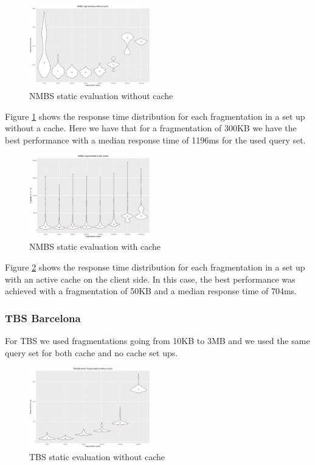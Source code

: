 \documentclass[sw]{iosart2x}
\begin{document}
	\begin{figure}[h]
		\includegraphics[width=0.47\textwidth]{nmbs/static_no_cache.png}
		\caption{NMBS static evaluation without cache}\label{fig:nmbs_static_no_cache}
	\end{figure}
	
	Figure \ref{fig:nmbs_static_no_cache} shows the response time distribution for each fragmentation in a set up without a cache. Here we have that for a fragmentation of 300KB we have the best performance with a median response time of 1196ms for the used query set. 
	
	\begin{figure}[h]
		\includegraphics[width=0.47\textwidth]{nmbs/static_cache.png}
		\caption{NMBS static evaluation with cache}\label{fig:nmbs_static_cache}
	\end{figure}
	
	Figure \ref{fig:nmbs_static_cache} shows the response time distribution for each fragmentation in a set up with an active cache on the client side. In this case, the best performance was achieved with a fragmentation of 50KB and a median response time of 704ms.
	
	\subsubsection{TBS Barcelona}
	For TBS we used fragmentations going from 10KB to 3MB and we used the same query set for both cache and no cache set ups.
	
	\begin{figure}[h]
		\includegraphics[width=0.47\textwidth]{tbs/no_cache.png}
		\caption{TBS static evaluation without cache}\label{fig:tbs_no_cache}
	\end{figure}
	
\end{document}
